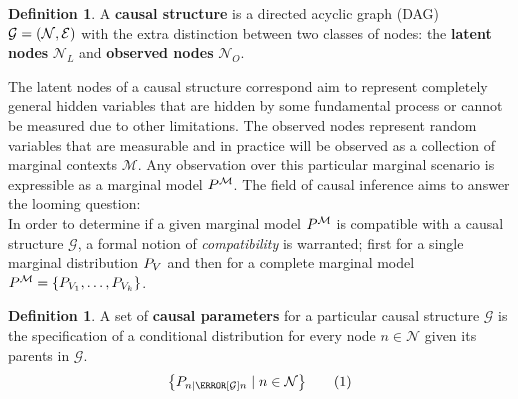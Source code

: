\documentclass[aps, 10pt, english, twoside, pra, nofootinbib, longbibliography]{revtex4-1}
\theoremstyle{plain}
\theoremstyle{definition}
\newtheorem{definition}[theorem]{Definition}
\theoremstyle{remark}
\newcommand{\graph}{\mathcal{G}}
\newcommand{\nodes}{\mathcal{N}}
\newcommand{\edges}{\mathcal{E}}
\newcommand{\mscenario}{\mathcal{M}}
\newcommand{\term}[1]{\textcolor{Mahogany}{\textbf{#1}}}
\begin{document}
    \begin{definition}
        A \term{causal structure} is a directed acyclic graph (DAG) $\graph = \br{\nodes, \edges}$ with the extra distinction between two classes of nodes: the \term{latent nodes} $\nodes_L$ and \term{observed nodes} $\nodes_O$.
    \end{definition}
    The latent nodes of a causal structure correspond aim to represent completely general hidden variables that are hidden by some fundamental process or cannot be measured due to other limitations. The observed nodes represent random variables that are measurable and in practice will be observed as a collection of marginal contexts $\mscenario$. Any observation over this particular marginal scenario is expressible as a marginal model $\prob^{\mscenario}$. The field of causal inference aims to answer the looming question:  \\

    In order to determine if a given marginal model $\prob^{\mscenario}$ is compatible with a causal structure $\graph$, a formal notion of \textit{compatibility} is warranted; first for a single marginal distribution $\prob[V]$ and then for a complete marginal model $\prob^{\mscenario} = \bc{\prob[V_1], \ldots, \prob[V_k]}$.

    \begin{definition}
        A set of \term{causal parameters} for a particular causal structure $\graph$ is the specification of a conditional distribution for every node $n \in \nodes$ given its parents in $\graph$.
        \[ \bc{\prob[n \mid \Pa[\graph]{n}] \mid n \in \nodes} \eq \label{eq:def:casual_param}\]
    \end{definition}
\end{document}
